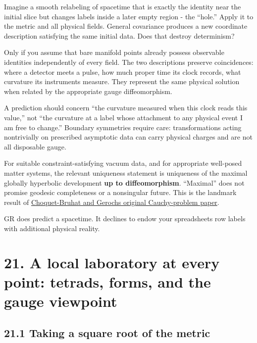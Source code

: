 \documentclass[
  11pt,
  letterpaper,
  oneside,
  openany]{scrbook}
\begin{document}
Imagine a smooth relabeling of spacetime that is exactly the identity
near the initial slice but changes labels inside a later empty region -
the ``hole.'' Apply it to the metric and all physical fields. General
covariance produces a new coordinate description satisfying the same
initial data. Does that destroy determinism?

Only if you assume that bare manifold points already possess observable
identities independently of every field. The two descriptions preserve
coincidences: where a detector meets a pulse, how much proper time its
clock records, what curvature its instruments measure. They represent
the same physical solution when related by the appropriate gauge
diffeomorphism.

A prediction should concern ``the curvature measured when this clock
reads this value,'' not ``the curvature at a label whose attachment to
any physical event I am free to change.'' Boundary symmetries require
care: transformations acting nontrivially on prescribed asymptotic data
can carry physical charges and are not all disposable gauge.

For suitable constraint-satisfying vacuum data, and for appropriate
well-posed matter systems, the relevant uniqueness statement is
uniqueness of the maximal globally hyperbolic development \textbf{up to
diffeomorphism}. ``Maximal'' does not promise geodesic completeness or a
nonsingular future. This is the landmark result of
\href{https://projecteuclid.org/journals/communications-in-mathematical-physics/volume-14/issue-4/Global-aspects-of-the-Cauchy-problem-in-general-relativity/cmp/1103841822.pdf}{Choquet-Bruhat
and Geroch\textquotesingle s original Cauchy-problem paper}.

GR does predict a spacetime. It declines to endow your
spreadsheet\textquotesingle s row labels with additional physical
reality.

\hypertarget{chapter-21}{%
\chapter{21. A local laboratory at every point: tetrads, forms, and the
gauge viewpoint}\label{chapter-21}}

\hypertarget{taking-a-square-root-of-the-metric}{%
\section{21.1 Taking a square root of the
metric}\label{taking-a-square-root-of-the-metric}}
\end{document}
